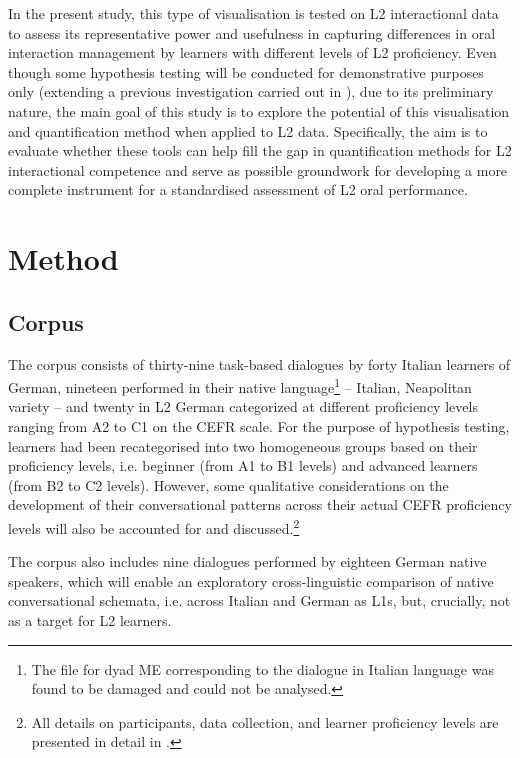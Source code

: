 In the present study, this type of visualisation is tested on L2 interactional data to assess its representative power and usefulness in capturing differences in oral interaction management by learners with different levels of L2 proficiency. Even though some hypothesis testing will be conducted for demonstrative purposes only (extending a previous investigation carried out in \citealt{SbrannaEtAl2020}), due to its preliminary nature, the main goal of this study is to explore the potential of this visualisation and quantification method when applied to L2 data. Specifically, the aim is to evaluate whether these tools can help fill the gap in quantification methods for L2 interactional competence and serve as possible groundwork for developing a more complete instrument for a standardised assessment of L2 oral performance.

\section{Method}
\label{sec:3.2}
\subsection{Corpus}
\label{sec:3.2.1}
The corpus consists of thirty-nine task-based dialogues by forty Italian learners of German, nineteen performed in their native language\footnote{The file for dyad ME corresponding to the dialogue in Italian language was found to be damaged and could not be analysed.} – Italian, Neapolitan variety – and twenty in L2 German categorized at different proficiency levels ranging from A2 to C1 on the CEFR scale. For the purpose of hypothesis testing, learners had been recategorised into two homogeneous groups based on their proficiency levels, i.e. beginner (from A1 to B1 levels) and advanced learners (from B2 to C2 levels). However, some qualitative considerations on the development of their conversational patterns across their actual CEFR proficiency levels will also be accounted for and discussed.\footnote{All details on participants, data collection, and learner proficiency levels are presented in detail in .}

The corpus also includes nine dialogues performed by eighteen German native speakers, which will enable an exploratory cross-linguistic comparison of native conversational schemata, i.e. across Italian and German as L1s, but, crucially, not as a target for L2 learners. 

